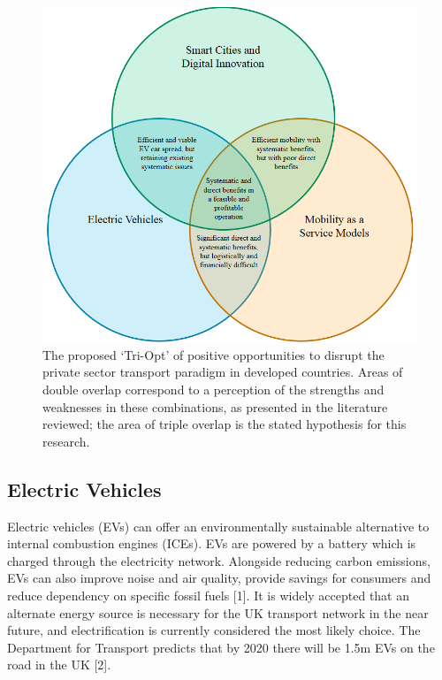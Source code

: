 \documentclass[journal]{IEEEtran}
\begin{document}
\begin{figure}[!htb]
\centering
\includegraphics[width=\columnwidth]{images/triopt.png}
\caption{The proposed `Tri-Opt' of positive opportunities to disrupt
  the private sector transport paradigm in developed countries. Areas
  of double overlap correspond to a perception of the strengths and
  weaknesses in these combinations, as presented in the literature
  reviewed; the area of triple overlap is the stated hypothesis for
  this research.}
\label{fig:triopt}
\end{figure}


\subsection{Electric Vehicles}

Electric vehicles (EVs) can offer an environmentally sustainable
alternative to internal combustion engines (ICEs). EVs are powered by
a battery which is charged through the electricity network. Alongside
reducing carbon emissions, EVs can also improve noise and air quality,
provide savings for consumers and reduce dependency on specific fossil
fuels [1]. It is widely accepted that an alternate energy source is
necessary for the UK transport network in the near future, and
electrification is currently considered the most likely choice. The
Department for Transport predicts that by 2020 there will be 1.5m EVs
on the road in the UK [2].
\end{document}

